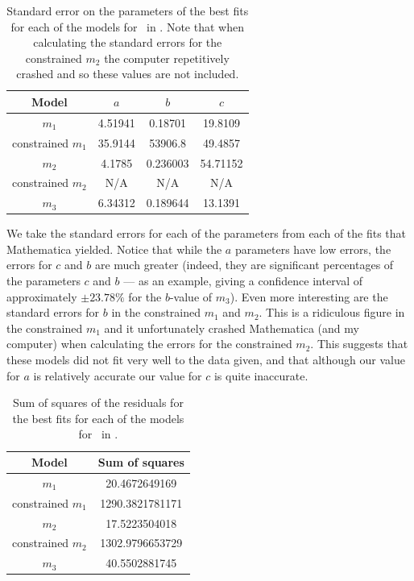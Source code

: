 \begin{table}[ht!]
\centering
\begin{tabular}{|c|c|c|c|}
\hline
{\bf Model} &  $a$ & $b$ & $c$ \\
\hline
$m_1$ & 4.51941 & 0.18701 & 19.8109 \\
\hline
constrained $m_1$ & 35.9144 & 53906.8 & 49.4857 \\
\hline
$m_2$ & 4.1785 & 0.236003 & 54.71152\\
\hline
constrained $m_2$ & N/A & N/A & N/A \\
\hline
$m_3$ & 6.34312 & 0.189644 & 13.1391 \\
\hline
\end{tabular}
\caption{Standard error on the parameters of the best fits for each of the models for \PO\ in \LA.
Note that when calculating the standard errors for the constrained $m_2$ the
  computer repetitively crashed and so these values are not included.}
\label{table:P1LA:abc:error}
\end{table}

We take the standard errors for each of the parameters from each of the fits that Mathematica yielded.
Notice that while the $a$ parameters have low errors, the errors for $c$ and $b$ are
much greater (indeed, they are significant percentages of the parameters $c$ and
$b$ --- as an example, giving a confidence interval of approximately $\pm
23.78\%$ for the $b$-value of $m_3$).
Even more interesting are the standard errors for $b$ in the constrained $m_1$
and $m_2$.
This is a ridiculous
figure in the constrained $m_1$ and it unfortunately crashed Mathematica (and my
computer) when calculating the errors for the constrained $m_2$.
This suggests that these models did not fit very well to the data given, and
that although our value for $a$ is relatively accurate our value for $c$ is
quite inaccurate.

\begin{table}[ht!]
\centering
\begin{tabular}{|c|c|}
\hline
{\bf Model} & Sum of squares \\
\hline
$m_1$ & 20.4672649169\\
\hline
constrained $m_1$ & 1290.3821781171\\
\hline
$m_2$ & 17.5223504018\\
\hline
constrained $m_2$ & 1302.9796653729\\
\hline
$m_3$ & 40.5502881745 \\
\hline
\end{tabular}
\caption{Sum of squares of the residuals for the best fits for each of the models for \PO\ in \LA.}
\label{table:P1LA:abc:sumsquares}
\end{table}

